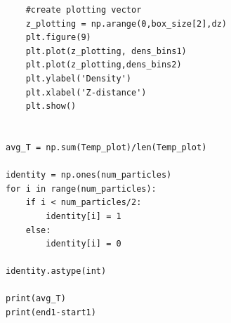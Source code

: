 \documentclass{article}
\begin{document}
\begin{lstlisting}
    #create plotting vector
    z_plotting = np.arange(0,box_size[2],dz)
    plt.figure(9)
    plt.plot(z_plotting, dens_bins1)
    plt.plot(z_plotting,dens_bins2)
    plt.ylabel('Density')
    plt.xlabel('Z-distance')
    plt.show()


avg_T = np.sum(Temp_plot)/len(Temp_plot)

identity = np.ones(num_particles)
for i in range(num_particles):
    if i < num_particles/2:
        identity[i] = 1
    else:
        identity[i] = 0
        
identity.astype(int)

print(avg_T)
print(end1-start1)



\end{lstlisting}
\end{document}
